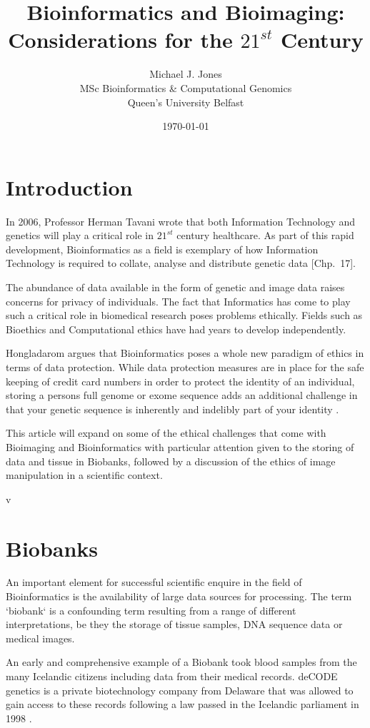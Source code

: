 \documentclass[british,a4paper, 12pt]{article}
\title{Bioinformatics and Bioimaging: Considerations for the $21^{st}$ Century}
\author{Michael J. Jones \\
  MSc Bioinformatics \& Computational Genomics \\
  Queen's University Belfast}
\date{\today}
\begin{document}
\maketitle

\section{Introduction}
In 2006, Professor Herman Tavani wrote that both Information Technology and
genetics will play a critical role in $21^{st}$ century healthcare. As part of
this rapid development, Bioinformatics as a field is exemplary of how
Information Technology is required to collate, analyse and distribute genetic
data \parencite{tavani2006ethics}[Chp.~17].

The abundance of data available in the form of genetic and image data raises
concerns for privacy of individuals. The fact that Informatics has come to
play such a critical role in biomedical research poses problems ethically.
Fields such as Bioethics and Computational ethics have had years to develop
independently.

Hongladarom argues that Bioinformatics poses a whole new paradigm of ethics in
terms of data protection. While data protection measures are in place for the
safe keeping of credit card numbers in order to protect the identity of an
individual, storing a persons full genome or exome sequence adds an additional
challenge in that your genetic sequence is inherently and indelibly part of
your identity \parencite{hongladarom2006ethics}.

This article will expand on some of the ethical challenges that come with
Bioimaging and Bioinformatics with particular attention given to the storing
of data and tissue in Biobanks, followed by a discussion of the ethics of
image manipulation in a scientific context.

v\section{Biobanks}
An important element for successful scientific enquire in the field of
Bioinformatics is the availability of large data sources for processing. The
term `biobank` is a confounding term resulting from a range of different
interpretations, be they the storage of tissue samples, DNA sequence data or
medical images.

An early and comprehensive example of a Biobank took blood samples from the
many Icelandic citizens including data from their medical records. deCODE
genetics is a private biotechnology company from Delaware that was allowed to
gain access to these records following a law passed in the Icelandic parliament
in 1998 \parencite{chadwick1999icelandic}.
\end{document}
